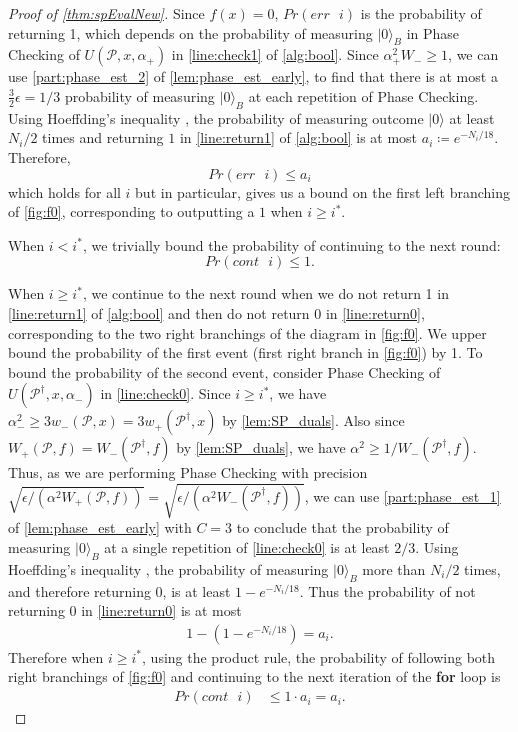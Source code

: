 \documentclass[cleveref, autoref, thm-restate,11pt]{article}
\theoremstyle{definition}
\newcommand{\sop}[1]{{\mathcal #1}}
\newcommand{\ket}[1]{|#1\rangle}
\newcommand{\U}[3]{{U({#1},{#2},{#3})}}
\renewcommand{\wp}[2]{{w_+({#1},{#2})}}
\newcommand{\wm}[2]{{w_-({#1},{#2})}}
\newcommand{\PrCont}[1][i]{Pr(cont\textrm{ }#1)} %
\newcommand{\PrErr}[1][i]{Pr(err\textrm{ }#1)} %
\begin{document}
\begin{proof}[Proof of \cref{thm:spEvalNew}]
Since $f(x)=0$, $\PrErr$ is the probability of returning 1, which depends on
the probability of measuring $\ket{0}_B$ in Phase Checking of 
$\U{\sop P}{x}{\alpha_+}$ in \cref{line:check1} of \cref{alg:bool}. Since $\alpha_+^2W_-\geq 1$, we can use \cref{part:phase_est_2} of 
\cref{lem:phase_est_early}, to find that there is
at most a $\frac{3}{2}\epsilon=1/3$ probability of measuring $\ket{0}_B$ at
each repetition of Phase Checking. Using Hoeffding's inequality 
\cite{Hoeff63}, the probability of measuring outcome $\ket{0}$ at least 
$N_{i}/2$ times and returning $1$ in \cref{line:return1} of \cref{alg:bool} is at most
$a_i \coloneqq e^{-N_{i}/18}$. Therefore,
\begin{equation} \label{eq:ai}
    \PrErr \leq a_i
\end{equation}
which holds for all $i$ but in particular, gives us a bound on the first left branching of \cref{fig:f0}, corresponding to outputting a $1$ when $i\geq i^*$. 



When $i < i^*$, we trivially bound the probability of continuing to the next round:
\begin{equation} \label{eq: earlyCont}
    \PrCont[i] \leq 1.
\end{equation}

When $i \geq i^*$, we continue to the next round when we do not return 1 in
\cref{line:return1} of \cref{alg:bool} and then do not return 0 in \cref{line:return0}, corresponding
to the two right branchings of the diagram in \cref{fig:f0}. We upper bound
the probability of the first event (first right branch in \cref{fig:f0}) by
1. To bound the probability of the second event, consider Phase Checking of
$\U{\sop P^\dagger}{x}{\alpha_-}$ in \cref{line:check0}. Since $i \geq i^*$, 
we have $\alpha_-^2\geq 3\wm{\sop P}{x}= 3\wp{\sop P^\dagger}{x}$ by \cref{lem:SP_duals}. 
Also since $W_+(\sop P,f)=W_-(\sop P^\dagger, f)$ by \cref{lem:SP_duals}, 
we have $\alpha^2\geq 1/W_-(\sop P^\dagger,f)$. Thus, as we are performing Phase Checking 
with precision $\sqrt{\epsilon/(\alpha^2W_+(\sop P,f))}=\sqrt{\epsilon/(\alpha^2W_-(\sop P^\dagger ,f))}$,
we can use \cref{part:phase_est_1} of \cref{lem:phase_est_early} with $C=3$
to conclude that the probability of measuring $\ket{0}_B$ at a single
repetition of \cref{line:check0} is at least $2/3$. Using Hoeffding's inequality 
\cite{Hoeff63}, the probability of measuring $\ket{0}_B$ more than $N_i/2$ times,
and therefore returning 0, is at least $1-e^{-N_i/18}$. Thus the probability
of not returning 0 in \cref{line:return0} is at most
\begin{align}
 1-(1-e^{-N_i/18}) = a_i.
 \label{eq:partCont}
 \end{align} 
Therefore when $i \geq i^*$, using the product rule, the probability of following both right branchings of \cref{fig:f0} and continuing to the next iteration of the \textbf{for} loop is
\begin{align}
    \PrCont[i]
    &\leq 1 \cdot a_i=a_i.\label{eq:lateCont} 
\end{align}









\end{proof}
\end{document}
